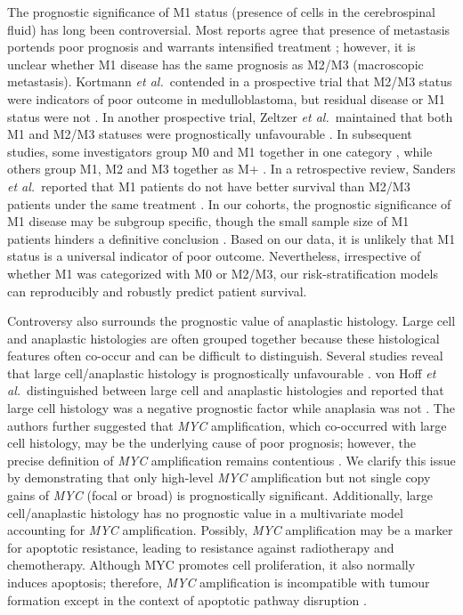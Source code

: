 The prognostic significance of M1 status (presence of cells in the cerebrospinal fluid) has long been controversial. Most reports agree that presence of metastasis portends poor prognosis and warrants intensified treatment ; however, it is unclear whether M1 disease has the same prognosis as M2/M3 (macroscopic metastasis). Kortmann \emph{et al.}\ contended in a prospective trial that M2/M3 status were indicators of poor outcome in medulloblastoma, but residual disease or M1 status were not . In another prospective trial, Zeltzer \emph{et al.}\ maintained that both M1 and M2/M3 statuses were prognostically unfavourable . In subsequent studies, some investigators group M0 and M1 together in one category , while others group M1, M2 and M3 together as M+ . In a retrospective review, Sanders \emph{et al.}\ reported that M1 patients do not have better survival than M2/M3 patients under the same treatment . In our cohorts, the prognostic significance of M1 disease may be subgroup specific, though the small sample size of M1 patients hinders a definitive conclusion . Based on our data, it is unlikely that M1 status is a universal indicator of poor outcome. Nevertheless, irrespective of whether M1 was categorized with M0 or M2/M3, our risk-stratification models can reproducibly and robustly predict patient survival.

Controversy also surrounds the prognostic value of anaplastic histology. Large cell and anaplastic histologies are often grouped together because these histological features often co-occur and can be difficult to distinguish. Several studies reveal that large cell/anaplastic histology is prognostically unfavourable . von Hoff \emph{et al.}\ distinguished between large cell and anaplastic histologies and reported that large cell histology was a negative prognostic factor while anaplasia was not . The authors further suggested that \emph{MYC} amplification, which co-occurred with large cell histology, may be the underlying cause of poor prognosis; however, the precise definition of \emph{MYC} amplification remains contentious . We clarify this issue by demonstrating that only high-level \emph{MYC} amplification but not single copy gains of \emph{MYC} (focal or broad) is prognostically significant. Additionally, large cell/anaplastic histology has no prognostic value in a multivariate model accounting for \emph{MYC} amplification. Possibly, \emph{MYC} amplification may be a marker for apoptotic resistance, leading to resistance against radiotherapy and chemotherapy. Although MYC promotes cell proliferation, it also normally induces apoptosis; therefore, \emph{MYC} amplification is incompatible with tumour formation except in the context of apoptotic pathway disruption .

